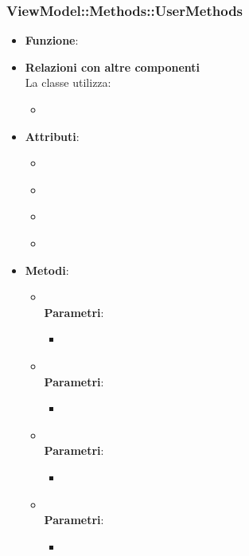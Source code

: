 \subsubsection{ViewModel::Methods::UserMethods}
\begin{itemize}
\item\textbf{Funzione}:
\item\textbf{Relazioni con altre componenti}\\
La classe utilizza:
	\begin{itemize}
		\item
	\end{itemize}
\item\textbf{Attributi}:
	\begin{itemize}
		\item\code{}\\
		\item\code{}\\
		\item\code{}\\
		\item\code{}\\
	\end{itemize}
\item\textbf{Metodi}:
	\begin{itemize}
		\item\code{}\\
		\textbf{Parametri}:
			\begin{itemize}
				\item\code{}\\
			\end{itemize}
		\item\code{}\\
		\textbf{Parametri}:
			\begin{itemize}
				\item\code{}\\
			\end{itemize}
		\item\code{}\\
		\textbf{Parametri}:
			\begin{itemize}
				\item\code{}\\
			\end{itemize}
		\item\code{}\\
		\textbf{Parametri}:
			\begin{itemize}
				\item\code{}\\
			\end{itemize}
	\end{itemize}
\end{itemize}

